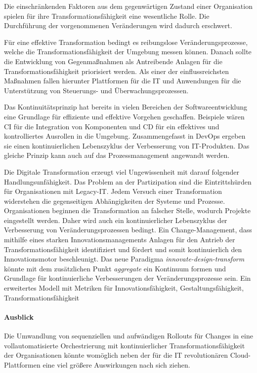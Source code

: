 Die einschränkenden Faktoren aus dem gegenwärtigen Zustand einer Organisation spielen für ihre Transformationsfähigkeit eine wesentliche Rolle. Die Durchführung der vorgenommenen Veränderungen wird dadurch erschwert. 

Für eine effektive Transformation bedingt es reibungslose Veränderungsprozesse, welche die Transformationsfähigkeit der Umgebung messen können. Danach sollte die Entwicklung von Gegenmaßnahmen als Antreibende Anlagen für die Transformationsfähigkeit priorisiert werden. Als einer der einflussreichsten Maßnahmen fallen hierunter Plattformen für die IT und Anwendungen für die Unterstützung von Steuerungs- und Überwachungsprozessen.

Das Kontinuitätsprinzip hat bereits in vielen Bereichen der Softwareentwicklung eine Grundlage für effiziente und effektive Vorgehen geschaffen. Beispiele wären \ac{CI} für die Integration von Komponenten und \ac{CD} für ein effektives und kontrolliertes Ausrollen in die Umgebung. Zusammengefasst in DevOps ergeben sie einen kontinuierlichen Lebenszyklus der Verbesserung von IT-Produkten. Das gleiche Prinzip kann auch auf das Prozessmanagement angewandt werden.

Die Digitale Transformation erzeugt viel Ungewissenheit mit darauf folgender Handlungsunfähigkeit. Das Problem an der Partizipation sind die Eintrittshürden für Organisationen mit Legacy-IT. Jedem Versuch einer Transformation widerstehen die gegenseitigen Abhängigkeiten der Systeme und Prozesse. Organisationen beginnen die Transformation an falscher Stelle, wodurch Projekte eingestellt werden. Daher wird auch ein kontinuierlicher Lebenszyklus der Verbesserung von Veränderungsprozessen bedingt. Ein Change-Management, dass mithilfe eines starken Innovationsmanagements Anlagen für den Antrieb der Transformationsfähigkeit identifiziert und fördert und somit kontinuierlich den Innovationsmotor beschleunigt.
Das neue Paradigma \emph{innovate-design-transform} könnte mit dem zusätzlichen Punkt \emph{aggregate} ein Kontinuum formen und Grundlage für kontinuierliche Verbesserungen der Veränderungsprozesse sein. Ein erweitertes Modell mit Metriken für Innovationsfähigkeit, Gestaltungsfähigkeit, Transformationsfähigkeit

\paragraph{Ausblick}


Die Umwandlung von sequenziellen und aufwändigen Rollouts für Changes in eine vollautomatisierte Orchestrierung mit kontinuierlicher Transformationsfähigkeit der Organisationen könnte womöglich neben der für die IT revolutionären Cloud-Plattformen eine viel größere Auswirkungen nach sich ziehen. 

